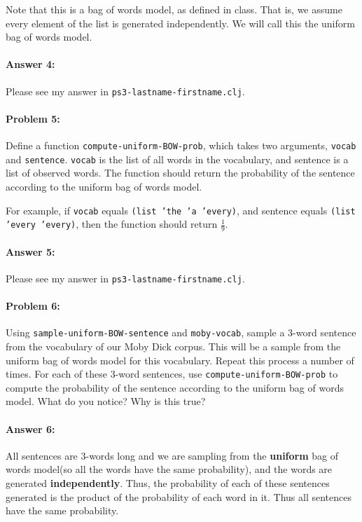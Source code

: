 \documentclass[10pt]{article}
\newcommand{\PSnum}{3}
\begin{document}
Note that this is a bag of words model, as defined in class. That is,
we assume every element of the list is generated independently. We
will call this the uniform bag of words model.

\paragraph{Answer 4:} Please see my answer in
\texttt{ps\PSnum-lastname-firstname.clj}.

\noindent\hrulefill %

\paragraph{Problem 5:}

Define a function \texttt{compute-uniform-BOW-prob}, which takes two
arguments, \texttt{vocab} and \texttt{sentence}. \texttt{vocab} is the
list of all words in the vocabulary, and sentence is a list of
observed words. The function should return the probability of the
sentence according to the uniform bag of words model.

For example, if \texttt{vocab} equals \texttt{(list 'the 'a 'every)},
and sentence equals \texttt{(list 'every 'every)}, then the function
should return $\frac{1}{9}$.

\paragraph{Answer 5:} Please see my answer in
\texttt{ps\PSnum-lastname-firstname.clj}.

\noindent\hrulefill %

\paragraph{Problem 6:}

Using \texttt{sample-uniform-BOW-sentence} and \texttt{moby-vocab},
sample a 3-word sentence from the vocabulary of our Moby Dick
corpus. This will be a sample from the uniform bag of words model for
this vocabulary. Repeat this process a number of times. For each of
these 3-word sentences, use \texttt{compute-uniform-BOW-prob} to
compute the probability of the sentence according to the uniform bag
of words model. What do you notice? Why is this true?

\paragraph{Answer 6:} All sentences are 3-words long and we are sampling from the \textbf{uniform} bag of words model(so all the words have the same probability), and the words are generated \textbf{independently}. Thus, the probability of each of these sentences generated is the product of the probability of each word in it. Thus all sentences have the same probability.
\end{document}
